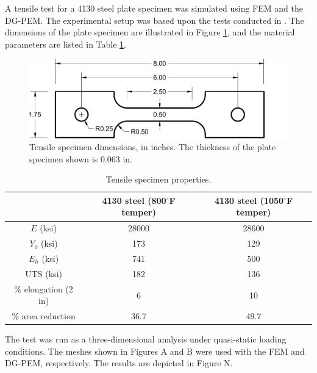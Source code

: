A tensile test for a 4130 steel plate specimen was simulated using FEM and the DG-PEM. The experimental setup was based upon the tests conducted in \cite{Gerberich:62}. The dimensions of the plate specimen are illustrated in Figure \ref{fig:tensile_specimen_dimensions}, and the material parameters are listed in Table \ref{tab:tensile_specimen_properties}.
\begin{figure}[!h]
  \centering
  \includegraphics[width=6.0in]{figures/tensile_specimen_dimensions.pdf}
  \caption{Tensile specimen dimensions, in inches. The thickness of the plate specimen shown is $0.063$ in.}
  \label{fig:tensile_specimen_dimensions}
\end{figure}

\begin{table}[!ht]
  \begin{center}
    \begin{tabular}{| c || c | c |}
    \hline
      & 4130 steel (800$^{\circ}$F temper) & 4130 steel (1050$^{\circ}$F temper) \\ \hline \hline
    $E$ (ksi) & 28000 & 28600 \\ \hline
    $Y_0$ (ksi) & 173 & 129 \\ \hline
    $E_h$ (ksi) & 741 & 500 \\ \hline
    UTS (ksi) & 182 & 136 \\ \hline
    \% elongation (2 in) & 6 & 10 \\ \hline
    \% area reduction & 36.7 & 49.7 \\
    \hline
    \end{tabular}
    \caption{Tensile specimen properties.}
    \vspace{-5pt}
    \label{tab:tensile_specimen_properties}
    \vspace{-25pt}
  \end{center}
\end{table}

The test was run as a three-dimensional analysis under quasi-static loading conditions. The meshes shown in Figures A and B were used with the FEM and DG-PEM, respectively. The results are depicted in Figure N.

